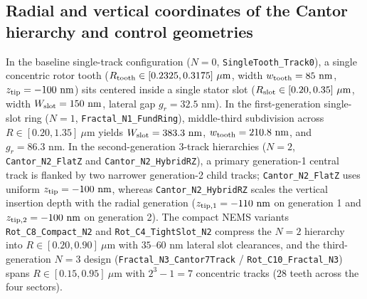 \documentclass[11pt,letterpaper]{article}
\begin{document}
\subsection*{Radial and vertical coordinates of the Cantor hierarchy and control geometries}
In the baseline single-track configuration ($N=0$, \texttt{SingleTooth\_Track0}), a single concentric rotor tooth ($R_{\rm tooth} \in [0.2325, 0.3175]\ \mu\text{m}$, width $w_{\rm tooth} = 85\text{ nm}$, $z_{\rm tip} = -100\text{ nm}$) sits centered inside a single stator slot ($R_{\rm slot} \in [0.20, 0.35]\ \mu\text{m}$, width $W_{\rm slot} = 150\text{ nm}$, lateral gap $g_r = 32.5\text{ nm}$). In the first-generation single-slot ring ($N=1$, \texttt{Fractal\_N1\_FundRing}), middle-third subdivision across $R \in [0.20, 1.35]\ \mu\text{m}$ yields $W_{\rm slot} = 383.3\text{ nm}$, $w_{\rm tooth} = 210.8\text{ nm}$, and $g_r = 86.3\text{ nm}$. In the second-generation 3-track hierarchies ($N=2$, \texttt{Cantor\_N2\_FlatZ} and \texttt{Cantor\_N2\_HybridRZ}), a primary generation-1 central track is flanked by two narrower generation-2 child tracks; \texttt{Cantor\_N2\_FlatZ} uses uniform $z_{\rm tip} = -100\text{ nm}$, whereas \texttt{Cantor\_N2\_HybridRZ} scales the vertical insertion depth with the radial generation ($z_{\rm tip,1} = -110\text{ nm}$ on generation 1 and $z_{\rm tip,2} = -100\text{ nm}$ on generation 2). The compact NEMS variants \texttt{Rot\_C8\_Compact\_N2} and \texttt{Rot\_C4\_TightSlot\_N2} compress the $N=2$ hierarchy into $R \in [0.20, 0.90]\ \mu\text{m}$ with $35\text{--}60\text{ nm}$ lateral slot clearances, and the third-generation $N=3$ design (\texttt{Fractal\_N3\_Cantor7Track} / \texttt{Rot\_C10\_Fractal\_N3}) spans $R \in [0.15, 0.95]\ \mu\text{m}$ with $2^3 - 1 = 7$ concentric tracks ($28$ teeth across the four sectors).
\end{document}

